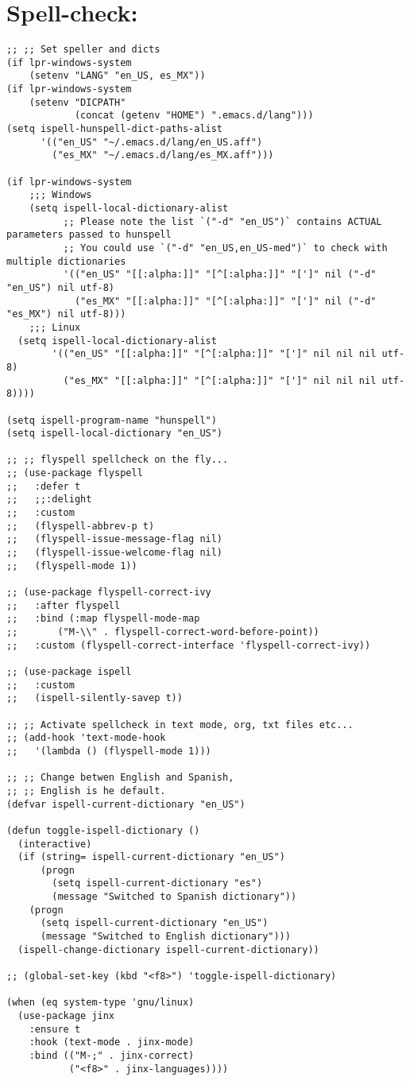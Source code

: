 \documentclass[11pt]{article}
\begin{document}
\section{Spell-check:}
\label{sec:org94c6d8e}
\begin{verbatim}
;; ;; Set speller and dicts
(if lpr-windows-system
    (setenv "LANG" "en_US, es_MX"))
(if lpr-windows-system
    (setenv "DICPATH"
            (concat (getenv "HOME") ".emacs.d/lang")))
(setq ispell-hunspell-dict-paths-alist
      '(("en_US" "~/.emacs.d/lang/en_US.aff")
        ("es_MX" "~/.emacs.d/lang/es_MX.aff")))

(if lpr-windows-system
    ;;; Windows
    (setq ispell-local-dictionary-alist
          ;; Please note the list `("-d" "en_US")` contains ACTUAL parameters passed to hunspell
          ;; You could use `("-d" "en_US,en_US-med")` to check with multiple dictionaries
          '(("en_US" "[[:alpha:]]" "[^[:alpha:]]" "[']" nil ("-d" "en_US") nil utf-8)
            ("es_MX" "[[:alpha:]]" "[^[:alpha:]]" "[']" nil ("-d" "es_MX") nil utf-8)))
    ;;; Linux
  (setq ispell-local-dictionary-alist
        '(("en_US" "[[:alpha:]]" "[^[:alpha:]]" "[']" nil nil nil utf-8)
          ("es_MX" "[[:alpha:]]" "[^[:alpha:]]" "[']" nil nil nil utf-8))))

(setq ispell-program-name "hunspell")
(setq ispell-local-dictionary "en_US")

;; ;; flyspell spellcheck on the fly...
;; (use-package flyspell
;;   :defer t
;;   ;;:delight
;;   :custom
;;   (flyspell-abbrev-p t)
;;   (flyspell-issue-message-flag nil)
;;   (flyspell-issue-welcome-flag nil)
;;   (flyspell-mode 1))

;; (use-package flyspell-correct-ivy
;;   :after flyspell
;;   :bind (:map flyspell-mode-map
;;       ("M-\\" . flyspell-correct-word-before-point))
;;   :custom (flyspell-correct-interface 'flyspell-correct-ivy))

;; (use-package ispell
;;   :custom
;;   (ispell-silently-savep t))

;; ;; Activate spellcheck in text mode, org, txt files etc...
;; (add-hook 'text-mode-hook
;;   '(lambda () (flyspell-mode 1)))

;; ;; Change betwen English and Spanish, 
;; ;; English is he default.
(defvar ispell-current-dictionary "en_US")

(defun toggle-ispell-dictionary ()
  (interactive)
  (if (string= ispell-current-dictionary "en_US")
      (progn
        (setq ispell-current-dictionary "es")
        (message "Switched to Spanish dictionary"))
    (progn
      (setq ispell-current-dictionary "en_US")
      (message "Switched to English dictionary")))
  (ispell-change-dictionary ispell-current-dictionary))

;; (global-set-key (kbd "<f8>") 'toggle-ispell-dictionary)

(when (eq system-type 'gnu/linux)
  (use-package jinx
    :ensure t
    :hook (text-mode . jinx-mode)
    :bind (("M-;" . jinx-correct)
           ("<f8>" . jinx-languages))))
\end{verbatim}
\end{document}
